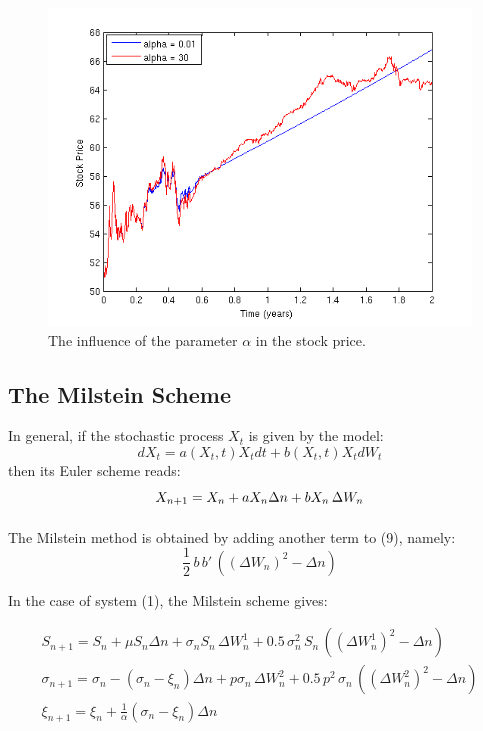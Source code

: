 \documentclass[11pt]{article}
\begin{document}
 \begin{figure}[h]
 \includegraphics{Figures/alpha_effect_S.png}
 \caption{The influence of the parameter $\alpha$ in the stock price.}
\end{figure}
\clearpage
\subsection{The Milstein Scheme}
In general, if the stochastic process $X_t$ is given by the model:
\begin{equation}
dX_t = a(X_t,t)X_t dt + b(X_t,t) X_t dW_t
\end{equation}
then its Euler scheme reads:
\begin{equation}
X_{n+1} = X_n + a X_n \Delta n+ b X_n \, \Delta W_n\\ 
\end{equation}
\paragraph{}
The Milstein method is obtained by adding another term to (9), namely: 
\begin{equation}
\frac{1}{2} \, b \, b' \,((\Delta W_n)^2 - \Delta n)
\end{equation}

In the case of system (1), the Milstein scheme gives:

\begin{eqnarray}
\nonumber
S_{n+1} = S_n +\mu S_n \Delta n+ \sigma_n S_n \, \Delta W_n^1 + 0.5 \, \sigma_n^2 \, S_n \, ( (\Delta W_n^1)^2 - \Delta n) \\
\sigma_{n+1} = \sigma_n - (\sigma_n - \xi_n) \Delta n + p \sigma_n \, \Delta W_n^2 + 0.5 \, p^2 \, \sigma_n \, ( (\Delta W_n^2)^2 - \Delta n)\\
\nonumber
\xi_{n+1} = \xi_n + \frac{1}{\alpha} (\sigma_n - \xi_n) \Delta n
\end{eqnarray}
\end{document}
